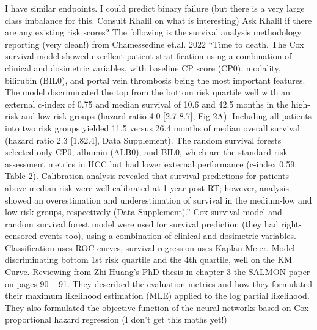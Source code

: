 \documentclass{article}%
\begin{document}
\newline%
\newline%
%
I have similar endpoints. I could predict binary failure (but there is a very large class imbalance for this. Consult Khalil on what is interesting) %
\newline%
\newline%
%
Ask Khalil if there are any existing risk scores? %
\newline%
\newline%
%
The following is the survival analysis methodology reporting (very clean!) from Chamessedine et.al. 2022 %
\newline%
\newline%
%
“Time to death. The Cox survival model showed excellent patient stratification using a combination of clinical and dosimetric variables, with baseline CP score (CP0), modality, bilirubin (BIL0), and portal vein thrombosis being the most important features. The model discriminated the top from the bottom risk quartile well with an external c{-}index of 0.75 and median survival of 10.6 and 42.5 months in the high{-}risk and low{-}risk groups (hazard ratio 4.0 {[}2.7{-}8.7{]}, Fig 2A). Including all patients into two risk groups yielded 11.5 versus 26.4 months of median overall survival (hazard ratio 2.3 {[}1.82.4{]}, Data Supplement). The random survival forests selected only CP0, albumin (ALB0), and BIL0, which are the standard risk assessment metrics in HCC but had lower external performance (c{-}index 0.59, Table 2). Calibration analysis revealed that survival predictions for patients above median risk were well calibrated at 1{-}year post{-}RT; however, analysis showed an overestimation and underestimation of survival in the medium{-}low and low{-}risk groups, respectively (Data Supplement).”%
\newline%
\newline%
%
Cox survival model and random survival forest model were used for survival prediction (they had right{-}censored events too), using a combination of clinical and dosimetric variables. %
\newline%
\newline%
%
Classification uses ROC curves, survival regression uses Kaplan Meier. Model discriminating bottom 1st risk quartile and the 4th quartile, well on the KM Curve.%
\newline%
\newline%
%
Reviewing from Zhi Huang’s PhD thesis in chapter 3 the SALMON paper on pages 90 – 91. They described the evaluation metrics and how they formulated their maximum likelihood estimation (MLE) applied to the log partial likelihood. They also formulated the objective function of the neural networks based on Cox proportional hazard regression (I don’t get this maths yet!) %
\end{document}
